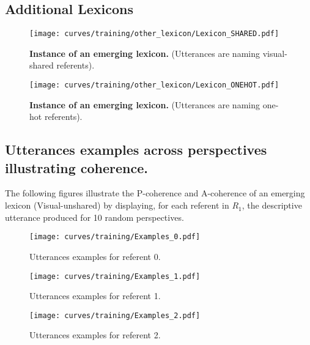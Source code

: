 \subsection{Additional Lexicons}
\label{sup:lexicon_one_hot_shared}


\begin{figure}[h!]

\centering
\texttt{[image: curves/training/other\_lexicon/Lexicon\_SHARED.pdf]}
\caption{\textbf{Instance of an emerging lexicon.} (Utterances are naming visual-shared referents).}
\end{figure}


\begin{figure}[h!]

\centering
    \texttt{[image: curves/training/other\_lexicon/Lexicon\_ONEHOT.pdf]}
    
\caption{\textbf{Instance of an emerging lexicon.} (Utterances are naming one-hot referents).}
\end{figure}

\newpage
\subsection{Utterances examples across perspectives illustrating coherence.}
\label{sup:P-coherence}

The following figures illustrate the P-coherence and A-coherence of an emerging lexicon (Visual-unshared) by displaying, for each referent in $R_1$, the descriptive utterance produced for 10 random perspectives.

\begin{figure}[h!]
\centering
    \texttt{[image: curves/training/Examples\_0.pdf]}
\caption{Utterances examples for referent 0.}
\end{figure}

\begin{figure}[h!]
\centering
    \texttt{[image: curves/training/Examples\_1.pdf]}
\caption{Utterances examples for referent 1.}
\end{figure}

\begin{figure}[h!]
\centering
    \texttt{[image: curves/training/Examples\_2.pdf]}
\caption{Utterances examples for referent 2.}
\end{figure}

